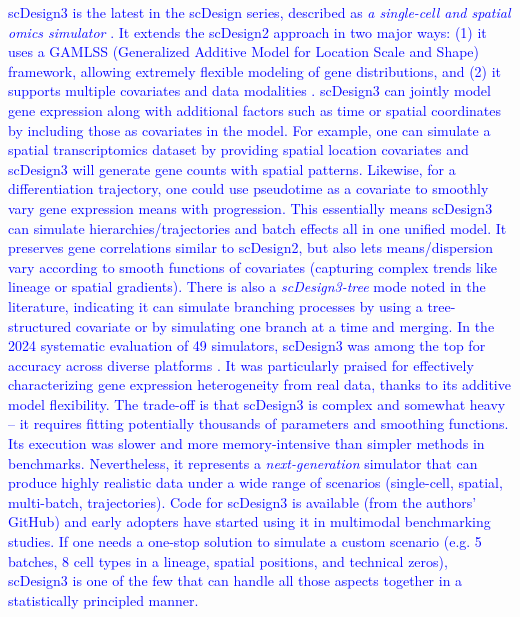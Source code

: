 \documentclass{article}
\newcommand{\gpt}[1]{\textcolor{blue}{#1}}
\begin{document}
\gpt{
scDesign3 is the latest in the scDesign series, described as \textit{a single-cell and spatial omics simulator} \cite{scdesign3}. It extends the scDesign2 approach in two major ways: (1) it uses a GAMLSS (Generalized Additive Model for Location Scale and Shape) framework, allowing extremely flexible modeling of gene distributions, and (2) it supports multiple covariates and data modalities \cite{duo2024systematic}. scDesign3 can jointly model gene expression along with additional factors such as time or spatial coordinates by including those as covariates in the model. For example, one can simulate a spatial transcriptomics dataset by providing spatial location covariates and scDesign3 will generate gene counts with spatial patterns. Likewise, for a differentiation trajectory, one could use pseudotime as a covariate to smoothly vary gene expression means with progression. This essentially means scDesign3 can simulate hierarchies/trajectories and batch effects all in one unified model. It preserves gene correlations similar to scDesign2, but also lets means/dispersion vary according to smooth functions of covariates (capturing complex trends like lineage or spatial gradients). There is also a \textit{scDesign3-tree} mode noted in the literature, indicating it can simulate branching processes by using a tree-structured covariate or by simulating one branch at a time and merging. In the 2024 systematic evaluation of 49 simulators, scDesign3 was among the top for accuracy across diverse platforms \cite{duo2024systematic}. It was particularly praised for effectively characterizing gene expression heterogeneity from real data, thanks to its additive model flexibility. The trade-off is that scDesign3 is complex and somewhat heavy – it requires fitting potentially thousands of parameters and smoothing functions. Its execution was slower and more memory-intensive than simpler methods in benchmarks. Nevertheless, it represents a \textit{next-generation} simulator that can produce highly realistic data under a wide range of scenarios (single-cell, spatial, multi-batch, trajectories). Code for scDesign3 is available (from the authors' GitHub) and early adopters have started using it in multimodal benchmarking studies. If one needs a one-stop solution to simulate a custom scenario (e.g. 5 batches, 8 cell types in a lineage, spatial positions, and technical zeros), scDesign3 is one of the few that can handle all those aspects together in a statistically principled manner.
}
\end{document}

